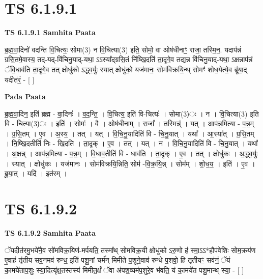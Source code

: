 \documentclass[17pt]{extarticle}
\begin{document}

\section{ TS 6.1.9.1 }

\textbf{TS 6.1.9.1 } \newline
\textbf{Samhita Paata} \newline

ब्र॒ह्म॒वा॒दिनो॑ वदन्ति वि॒चित्यः॒ सोमा(3) न वि॒चित्या(3) इति॒ सोमो॒ वा ओष॑धीनाꣳ॒॒ राजा॒ तस्मि॒न॒. यदाप॑न्नं ग्रसि॒तमे॒वास्य॒ तद्-यद्-वि॑चिनु॒याद्-यथा॒ ऽऽस्या᳚द्ग्रसि॒तं नि॑ष्खि॒दति॑ ता॒दृगे॒व तद्यन्न वि॑चिनु॒याद्-यथा॒ ऽक्षन्नाप॑न्नं ॅवि॒धाव॑ति ता॒दृगे॒व तत् क्षोधु॑को ऽद्ध्व॒र्युः स्यात् क्षोधु॑को॒ यज॑मानः॒ सोम॑विक्रयि॒न्थ् सोमꣳ॑ शोध॒येत्ये॒व ब्रू॑या॒द् यदीत॑रं॒ - [  ] \newline

\textbf{Pada Paata} \newline

ब्र॒ह्म॒वा॒दिन॒ इति॑ ब्रह्म - वा॒दिनः॑ । व॒द॒न्ति॒ । वि॒चित्य॒ इति॑ वि-चित्यः॑ । सोमा(3)ः । न । वि॒चित्या(3) इति वि - चित्या(3)ः । इति॑ । सोमः॑ । वै । ओष॑धीनाम् । राजा᳚ । तस्मिन्न्॑ । यत् । आप॑न्न॒मित्या - प॒न्न॒म् । ग्र॒सि॒तम् । ए॒व । अ॒स्य॒ । तत् । यत् । वि॒चि॒नु॒यादिति॑ वि - चि॒नु॒यात् । यथा᳚ । आ॒स्या᳚त् । ग्र॒सि॒तम् । नि॒ष्खि॒दतीति॑ निः -   खि॒दति॑ । ता॒दृक् । ए॒व । तत् । यत् । न । वि॒चि॒नु॒यादिति॑ वि - चि॒नु॒यात् । यथा᳚ । अ॒क्षन्न् । आप॑न्न॒मित्या - प॒न्न॒म् । वि॒धाव॒तीति॑ वि - धाव॑ति । ता॒दृक् । ए॒व । तत् । क्षोधु॑कः । अ॒द्ध्व॒र्युः । स्यात् । क्षोधु॑कः । यज॑मानः । सोम॑विक्रयि॒न्निति॒ सोम॑ -वि॒क्र॒यि॒न्न् । सोम᳚म् । शो॒ध॒य॒ । इति॑ । ए॒व । ब्रू॒या॒त् । यदि॑ । इत॑रम् ।  \newline





\section{ TS 6.1.9.2 }

\textbf{TS 6.1.9.2 } \newline
\textbf{Samhita Paata} \newline

ॅयदीत॑रमु॒भये॑नै॒व सो॑मविक्र॒यिण॑-मर्पयति॒ तस्मा᳚थ् सोमविक्र॒यी क्षोधु॑को ऽरु॒णो ह॑ स्मा॒ऽऽ*हौप॑वेशिः सोम॒क्रय॑ण ए॒वाहं तृ॑तीय सव॒नमव॑ रुन्ध॒ इति॑ पशू॒नां चर्म॑न् मिमीते प॒शूने॒वाव॑ रुन्धे प॒शवो॒ हि तृ॒तीयꣳ॒॒ सव॑नं॒ ॅयं का॒मये॑ताप॒शुः स्या॒दित्यृ॑क्ष॒तस्तस्य॑ मिमीत॒र्क्षं ॅवा अ॑पश॒व्यम॑प॒शुरे॒व भ॑वति॒ यं का॒मये॑त पशु॒मान्थ् स्या॒ - [  ] \newline
\end{document}

